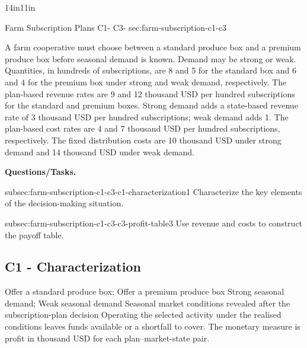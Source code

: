 {\begin{CalculationLandscape}{14in}{11in}
	
	\begingroup\renewcommand{\CalculationStateCount}{2}
\endgroup
\end{CalculationLandscape}


	
	}


	\sectionScored
	{Farm Subscription Plans}
	{C1- \hspace{2mm} C3-}
	{sec:farm-subscription-c1-c3}
	{
		A farm cooperative must choose between a standard produce box and a
		premium produce box before seasonal demand is known. Demand may be
		strong or weak. Quantities, in hundreds of subscriptions, are 8 and 5
		for the standard box and 6 and 4 for the premium box under strong and
		weak demand, respectively. The plan-based revenue rates are 9 and 12
		thousand USD per hundred subscriptions for the standard and premium
		boxes. Strong demand adds a state-based revenue rate of 3 thousand USD
		per hundred subscriptions; weak demand adds 1. The plan-based cost rates
		are 4 and 7 thousand USD per hundred subscriptions, respectively. The
		fixed distribution costs are 10 thousand USD under strong demand and
		14 thousand USD under weak demand.
		
		\textbf{Questions/Tasks.}
		\begin{enumerate}
			\CriterionTask
			{subsec:farm-subscription-c1-c3-c1-characterization}{1}
			{Characterize the key elements of the decision-making situation. }
			
			\CriterionTask
			{subsec:farm-subscription-c1-c3-c3-profit-table}{3}
			{Use revenue and costs to construct the payoff table. }
		\end{enumerate}
		
		\label{subsec:farm-subscription-c1-c3-c1-characterization}
		\subsection*{C1 - Characterization }
		
		\DecisionElementsTable
{Offer a standard produce box; Offer a premium produce box}
{Strong seasonal demand; Weak seasonal demand}
{Seasonal market conditions revealed after the subscription-plan decision}
{Operating the selected activity under the realised conditions leaves funds available or a shortfall to cover. The monetary measure is profit in thousand USD for each plan--market-state pair.}

}
